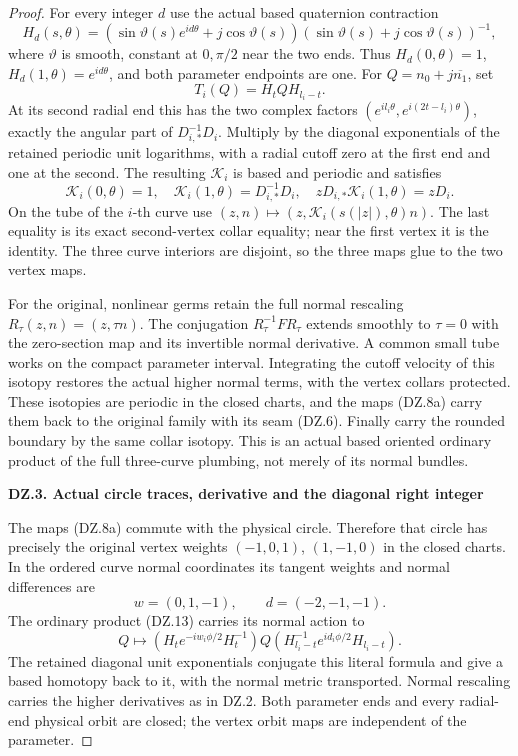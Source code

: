 \begin{proof}
For every integer \(d\) use the actual based quaternion contraction
\[
 H_d(s,\theta)=
  (\sin\vartheta(s)e^{id\theta}+j\cos\vartheta(s))
  (\sin\vartheta(s)+j\cos\vartheta(s))^{-1},          \tag{DZ.12}
\]
where \(\vartheta\) is smooth, constant at \(0,\pi/2\) near the two
ends. Thus \(H_d(0,\theta)=1\), \(H_d(1,\theta)=e^{id\theta}\), and
both parameter endpoints are one. For
\(Q=n_0+j\overline{n_1}\), set
\[
              T_i(Q)=H_t Q H_{l_i-t}.               \tag{DZ.13}
\]
At its second radial end this has the two complex factors
\((e^{il_i\theta},e^{i(2t-l_i)\theta})\), exactly the angular part
of \(D_{i,*}^{-1}D_i\). Multiply by the diagonal exponentials of
the retained periodic unit logarithms, with a radial cutoff zero
at the first end and one at the second. The resulting
\(\mathcal K_i\) is based and periodic and satisfies
\[
 \mathcal K_i(0,\theta)=1,\quad
 \mathcal K_i(1,\theta)=D_{i,*}^{-1}D_i,\quad
                   zD_{i,*}\mathcal K_i(1,\theta)=zD_i. \tag{DZ.14}
\]
On the tube of the \(i\)-th curve use
\((z,n)\mapsto(z,\mathcal K_i(s(|z|),\theta)n)\).
The last equality is its exact second-vertex collar equality;
near the first vertex it is the identity. The three curve interiors
are disjoint, so the three maps glue to the two vertex maps.

For the original, nonlinear germs retain the full normal rescaling
\(R_\tau(z,n)=(z,\tau n)\). The conjugation
\(R_\tau^{-1}FR_\tau\) extends smoothly to \(\tau=0\) with the
zero-section map and its invertible normal derivative. A common
small tube works on the compact parameter interval. Integrating
the cutoff velocity of this isotopy restores the actual higher
normal terms, with the vertex collars protected. These isotopies
are periodic in the closed charts, and the maps (DZ.8a) carry them
back to the original family with its seam (DZ.6).
Finally carry the rounded boundary by the same collar isotopy.
This is an actual based oriented ordinary product of the full
three-curve plumbing, not merely of its normal bundles.

\par

\medskip\noindent\textbf{DZ.3. Actual circle traces, derivative and the diagonal right integer}

\par\nobreak

The maps (DZ.8a) commute with the physical circle. Therefore that
circle has precisely the original vertex weights
\((-1,0,1)\), \((1,-1,0)\) in the closed charts. In the ordered
curve normal coordinates its tangent weights and normal differences
are
\[
                  w=(0,1,-1),\qquad d=(-2,-1,-1).
\]
The ordinary product (DZ.13) carries its normal action to
\[
 Q\longmapsto
 (H_t e^{-iw_i\phi/2}H_t^{-1})Q
 (H_{l_i-t}^{-1}e^{id_i\phi/2}H_{l_i-t}).            \tag{DZ.15}
\]
The retained diagonal unit exponentials conjugate this literal
formula and give a based homotopy back to it, with the normal metric
transported. Normal rescaling carries the higher derivatives as in
DZ.2. Both parameter ends and every radial-end physical orbit are
closed; the vertex orbit maps are independent of the parameter.


\end{proof}
